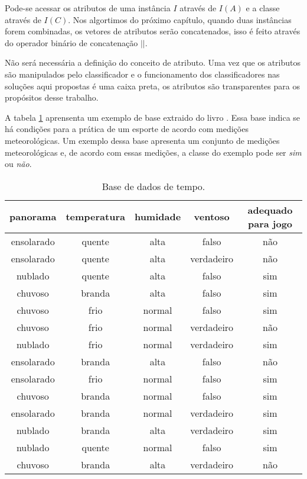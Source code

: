 Pode-se acessar os atributos de uma instância $I$ através de $I(A)$ e a classe através de $I(C)$. Nos algortimos do próximo capítulo, quando duas instâncias forem combinadas, os vetores de atributos serão concatenados, isso é feito através do operador binário de concatenação $||$.

Não será necessária a definição do conceito de atributo. Uma vez que os atributos são manipulados pelo classificador e o funcionamento dos classificadores nas soluções aqui propostas é uma caixa preta, os atributos são transparentes para os propósitos desse trabalho.

A tabela \ref{tab:weather} aprensenta um exemplo de base extraido do livro \cite{wekabook}. Essa base indica se há condições para a prática de um esporte de acordo com medições meteorológicas. Um exemplo dessa base apresenta um conjunto de medições meteorológicas e, de acordo com essas medições, a classe do exemplo pode ser \emph{sim} ou \emph{não}.

\begin{table}[h!]
    \centering
    \begin{tabular}{ccccc}
        \hline
        panorama & temperatura & humidade & ventoso & adequado para jogo \\
        \hline
        ensolarado & quente & alta & falso & não \\
        ensolarado & quente & alta & verdadeiro & não \\
        nublado & quente & alta & falso & sim \\
        chuvoso & branda & alta & falso & sim \\
        chuvoso & frio & normal & falso & sim \\
        chuvoso & frio & normal & verdadeiro & não \\
        nublado & frio & normal & verdadeiro & sim \\
        ensolarado & branda & alta & falso & não \\
        ensolarado & frio & normal & falso & sim \\
        chuvoso & branda & normal & falso & sim \\
        ensolarado & branda & normal & verdadeiro & sim \\
        nublado & branda & alta & verdadeiro & sim \\
        nublado & quente & normal & falso & sim \\
        chuvoso & branda & alta & verdadeiro & não \\
        \hline
    \end{tabular}

    \caption{Base de dados de tempo. \label{tab:weather}}
\end{table}


